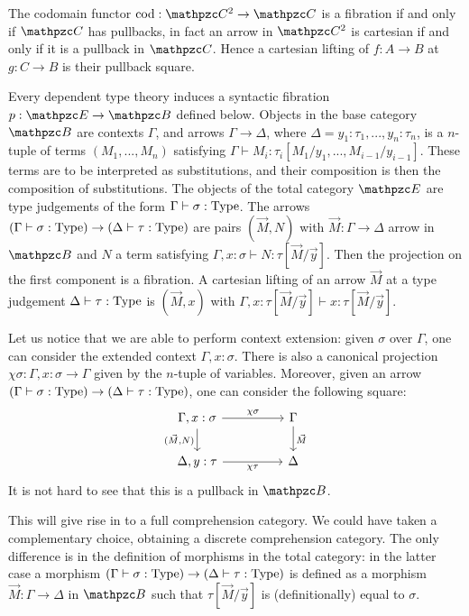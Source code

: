 \documentclass{lmcs} %
\theoremstyle{plain}\newtheorem{satz}[thm]{Satz} %
\begin{document}
			\begin{exa}\label{ex:cod}
				The codomain functor $\cod:\Arr{\ct{C}}\rightarrow \ct{C}$ is a fibration if and only if $\ct{C}$ has pullbacks, in fact an arrow in $\Arr{\ct{C}}$ is cartesian if and only if it is a pullback in $\ct{C}$. Hence a cartesian lifting of $f:A\to B$ at $g:C\to B$ is their pullback square.
			\end{exa}
			
			\begin{exa}\label{ex:typeth}
				Every dependent type theory induces a syntactic fibration $p : \ct{E}\to\ct{B}$ defined below.
				Objects in the base category $\ct{B}$ are contexts $\Gamma$, and arrows $\Gamma\to \Delta$, where $\Delta = y_1:\tau_1, ..., y_n:\tau_n$, is a $n$-tuple of terms $(M_1,...,M_n)$ satisfying $\Gamma \vdash M_i:\tau_i[M_1/y_1,..., M_{i-1}/y_{i-1}]$. These terms are to be interpreted as substitutions, and their composition is then the composition of substitutions. The objects of the total category $\ct{E}$ are type judgements of the form $\Gamma\vdash \sigma: \mathrm{Type}$. The arrows $(\Gamma\vdash \sigma:\mathrm{Type})\to (\Delta\vdash \tau:\mathrm{Type})$ are pairs $(\vec{M},N)$ with $\vec{M}:\Gamma\to \Delta$ arrow in $\ct{B}$ and $N$ a term satisfying $\Gamma, x:\sigma\vdash N:\tau [\vec{M}/\vec{y}]$. Then the projection on the first component is a fibration.
				A cartesian lifting of an arrow $\vec{M}$ at a type judgement $\Delta\vdash \tau:\mathrm{Type}$ is $(\vec{M},x)$ with $\Gamma, x:\tau[\vec{M}/\vec{y}]\vdash x:\tau[\vec{M}/\vec{y}]$.
				
				Let us notice that we are able to perform context extension: given $\sigma$ over $\Gamma$, one can consider the extended context $\Gamma, x:\sigma$. There is also a canonical projection $\chi\sigma:\Gamma, x:\sigma\to\Gamma$ given by the $n$-tuple of variables. Moreover, given an arrow $(\Gamma\vdash \sigma:\mathrm{Type})\to (\Delta\vdash \tau:\mathrm{Type})$, one can consider the following square:
				\[\begin{tikzcd}\label{diag:pb}
					{\Gamma,x:\sigma} && \Gamma \\
					{\Delta, y:\tau} && \Delta
					\arrow["{\chi\sigma}", from=1-1, to=1-3]
					\arrow["{(\vec{M},N)}"', from=1-1, to=2-1]
					\arrow["{\vec{M}}", from=1-3, to=2-3]
					\arrow["{\chi\tau}"', from=2-1, to=2-3]
				\end{tikzcd}\]
				It is not hard to see that this is a pullback in $\ct{B}$.

			This will give rise in  to a full comprehension category. We could have taken a complementary choice, obtaining a discrete comprehension category. The only difference is in the definition of morphisms in the total category: in the latter case a morphism $(\Gamma\vdash \sigma:\mathrm{Type})\to (\Delta\vdash \tau:\mathrm{Type})$ is defined as a morphism $\vec{M}:\Gamma\to\Delta$ in $\ct{B}$ such that $\tau[\vec{M}/\vec{y}]$ is (definitionally) equal to $\sigma$.
		 
			\end{exa}
\end{document}
